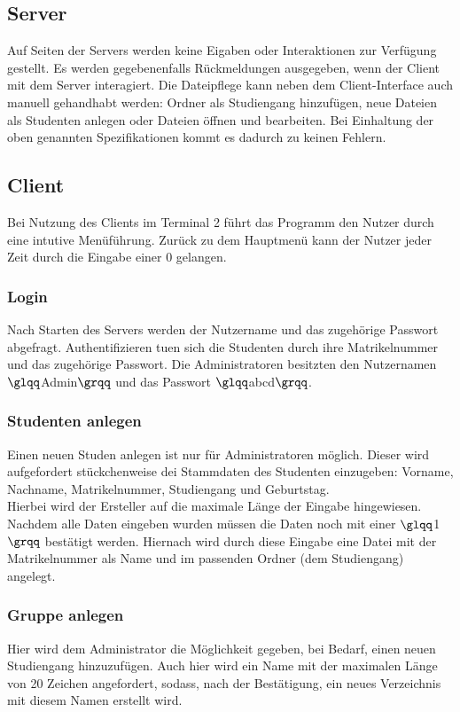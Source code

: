 \documentclass{scrartcl}
\begin{document}
	\subsection{Server}
		Auf Seiten der Servers werden keine Eigaben oder Interaktionen zur Verfügung gestellt. Es werden gegebenenfalls Rückmeldungen ausgegeben, wenn der Client mit dem Server interagiert. Die Dateipflege kann neben dem Client-Interface auch manuell gehandhabt werden: Ordner als Studiengang hinzufügen, neue Dateien als Studenten anlegen oder Dateien öffnen und bearbeiten. Bei Einhaltung der oben genannten Spezifikationen kommt es dadurch zu keinen Fehlern.
	\subsection{Client}
		Bei Nutzung des Clients im Terminal 2 führt das Programm den Nutzer durch eine intutive Menüführung. Zurück zu dem Hauptmenü kann der Nutzer jeder Zeit durch die Eingabe einer 0 gelangen.
		\subsubsection{Login}
			Nach Starten des Servers werden der Nutzername und das zugehörige Passwort abgefragt. Authentifizieren tuen sich die Studenten durch ihre Matrikelnummer und das zugehörige Passwort. 
			Die Administratoren besitzten den Nutzernamen $\glqq$Admin$\grqq$ und das Passwort $\glqq$abcd$\grqq$.
		\subsubsection{Studenten anlegen}
			Einen neuen Studen anlegen ist nur für Administratoren möglich. Dieser wird aufgefordert stückchenweise dei Stammdaten des Studenten einzugeben: Vorname, Nachname, Matrikelnummer, Studiengang und Geburtstag.\\
			Hierbei wird der Ersteller auf die maximale Länge der Eingabe hingewiesen. Nachdem alle Daten eingeben wurden müssen die Daten noch mit einer $\glqq$1$\grqq$ bestätigt werden. Hiernach wird durch diese Eingabe  eine Datei mit der Matrikelnummer als Name und im passenden Ordner (dem Studiengang) angelegt.
		\subsubsection{Gruppe anlegen}
			Hier wird dem Administrator die Möglichkeit gegeben, bei Bedarf, einen neuen Studiengang hinzuzufügen. Auch hier wird ein Name mit der maximalen Länge von 20 Zeichen angefordert, sodass, nach der Bestätigung, ein neues Verzeichnis mit diesem Namen erstellt wird.
\end{document}
